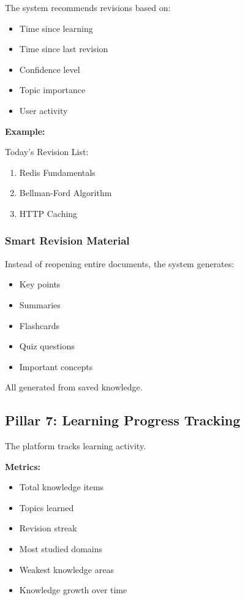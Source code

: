 \documentclass[11pt]{article}
\begin{document}
The system recommends revisions based on:

\begin{itemize}[nosep]
    \item Time since learning
    \item Time since last revision
    \item Confidence level
    \item Topic importance
    \item User activity
\end{itemize}

\textbf{Example:}

Today's Revision List:
\begin{enumerate}[nosep]
    \item Redis Fundamentals
    \item Bellman-Ford Algorithm
    \item HTTP Caching
\end{enumerate}

\subsubsection{Smart Revision Material}

Instead of reopening entire documents, the system generates:

\begin{itemize}[nosep]
    \item Key points
    \item Summaries
    \item Flashcards
    \item Quiz questions
    \item Important concepts
\end{itemize}

All generated from saved knowledge.

\subsection{Pillar 7: Learning Progress Tracking}

The platform tracks learning activity.

\textbf{Metrics:}
\begin{itemize}[nosep]
    \item Total knowledge items
    \item Topics learned
    \item Revision streak
    \item Most studied domains
    \item Weakest knowledge areas
    \item Knowledge growth over time
\end{itemize}
\end{document}
